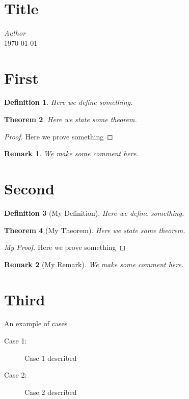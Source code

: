 \documentclass[landscape,twocolumn,10pt]{article}
\newtheorem{theorem}{Theorem}[section]
\newtheorem{definition}[theorem]{Definition}
\newtheorem*{remark}{Remark}
\begin{document}

\section*{Title}

\textit{Author} \\
\today

\section{First}

\begin{definition}
  Here we define something.
\end{definition}

\begin{theorem}
  Here we state some theorem.
\end{theorem}

\begin{proof}
  Here we prove something \qedhere
\end{proof}

\begin{remark}
  We make some comment here.
\end{remark}

\section{Second}

\begin{definition}[My Definition]
  Here we define something.
\end{definition}

\begin{theorem}[My Theorem]
  Here we state some theorem.
\end{theorem}

\begin{proof}[My Proof]
  Here we prove something \qedhere
\end{proof}

\begin{remark}[My Remark]
  We make some comment here.
\end{remark}

\section{Third}

An example of cases

\begin{description}
  \item[Case 1:] Case 1 described
  \item[Case 2:] Case 2 described
\end{description}
\end{document}
